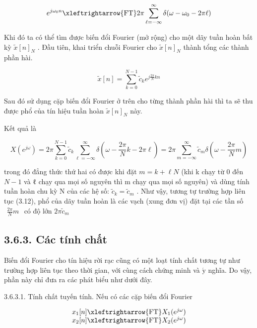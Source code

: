 \documentclass[
  10
]{article}
\begin{document}
\[
e ^ {j \omega_ {0} n} \xleftrightarrow {\mathrm{FT}} 2 \pi \sum_ {\ell = - \infty} ^ {\infty} \delta (\omega - \omega_ {0} - 2 \pi \ell)
\]

Khi đó ta có thể tìm được biến đổi Fourier (mở rộng) cho một dãy tuần
hoàn bất kỳ \({ \tilde { x } } [ n ] _ { N }\) . Đầu tiên, khai triển
chuỗi Fourier cho \({ \tilde { x } } [ n ] _ { N }\) thành tổng các
thành phần hài.

\[
\tilde {x} [ n ] = \sum_ {k = 0} ^ {N - 1} \tilde {c} _ {k} e ^ {j \frac {2 \pi}{N} k n}
\]

Sau đó sử dụng cặp biến đổi Fourier ở trên cho từng thành phần hài thì
ta sẽ thu được phổ của tín hiệu tuần hoàn
\({ \tilde { x } } [ n ] _ { N }\) này.

Kết quả là

\[
X (e ^ {j \omega}) = 2 \pi \sum_ {k = 0} ^ {N - 1} \tilde {c} _ {k} \sum_ {\ell = - \infty} ^ {\infty} \delta (\omega - \frac {2 \pi}{N} k - 2 \pi \ell) = 2 \pi \sum_ {m = - \infty} ^ {\infty} \tilde {c} _ {m} \delta (\omega - \frac {2 \pi}{N} m)\tag{3.22}
\]

trong đó đẳng thức thứ hai có được khi đặt \(m = k + \ell N\) (khi k
chạy từ 0 đến \(N - 1\) và ℓ chạy qua mọi số nguyên thì m chạy qua mọi
số nguyên) và dùng tính tuần hoàn chu kỳ N của các hệ số:
\(\tilde { c } _ { k } = \tilde { c } _ { m }\) . Như vậy, tương tự
trường hợp liên tục (3.12), phổ của dãy tuần hoàn là các vạch (xung đơn
vị) đặt tại các tần số
\(\begin{array} { r } { \frac { 2 \pi } { N } m } \end{array}\) có độ
lớn \(2 \pi \tilde { c } _ { m }\)

\subsection{3.6.3. Các tính chất}\label{cuxe1c-tuxednh-chux1ea5t}

Biến đổi Fourier cho tín hiệu rời rạc cũng có một loạt tính chất tương
tự như trường hợp liên tục theo thời gian, với cùng cách chứng minh và
\(\acute { \mathrm { y } }\) nghĩa. Do vậy, phần này chỉ đưa ra các phát
biểu như dưới đây.

3.6.3.1. Tính chất tuyến tính. Nếu có các cặp biến đổi Fourier

\[
\begin{array}{l} x _ {1} [ n ] \xleftrightarrow {\mathrm{FT}} X _ {1} (e ^ {j \omega}) \\ x _ {2} [ n ] \xleftrightarrow {\mathrm{FT}} X _ {2} (e ^ {j \omega}) \end{array}
\]
\end{document}
